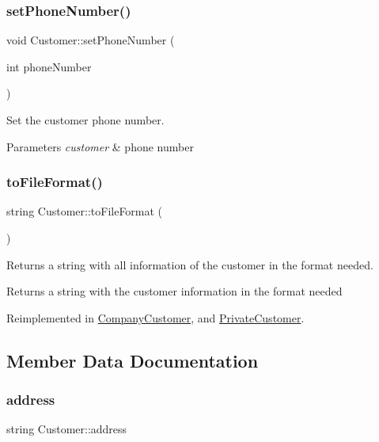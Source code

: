 \subsubsection{\texorpdfstring{set\+Phone\+Number()}{setPhoneNumber()}}
{\footnotesize\ttfamily void Customer\+::set\+Phone\+Number (\begin{DoxyParamCaption}\item[{int}]{phone\+Number }\end{DoxyParamCaption})}

Set the customer phone number. 
\begin{DoxyParams}{Parameters}
{\em customer} & phone number \\
\hline
\end{DoxyParams}
\hypertarget{classCustomer_aa609cffee22046082003ea0ac3c191af}{}\label{classCustomer_aa609cffee22046082003ea0ac3c191af} 
\subsubsection{\texorpdfstring{to\+File\+Format()}{toFileFormat()}}
{\footnotesize\ttfamily string Customer\+::to\+File\+Format (\begin{DoxyParamCaption}{ }\end{DoxyParamCaption})\hspace{0.3cm}{\ttfamily [virtual]}}

Returns a string with all information of the customer in the format needed. \begin{DoxyReturn}{Returns}
a string with the customer information in the format needed 
\end{DoxyReturn}


Reimplemented in \hyperlink{classCompanyCustomer_aae3bd828d590b136e6ca407ef6f47350}{Company\+Customer}, and \hyperlink{classPrivateCustomer_adb678cbc09d9e4a8e9e4ab0d556b8b6c}{Private\+Customer}.



\subsection{Member Data Documentation}
\hypertarget{classCustomer_a72d87951c1b76883390d00baf044cf2c}{}\label{classCustomer_a72d87951c1b76883390d00baf044cf2c} 
\subsubsection{\texorpdfstring{address}{address}}
{\footnotesize\ttfamily string Customer\+::address\hspace{0.3cm}{\ttfamily [private]}}

